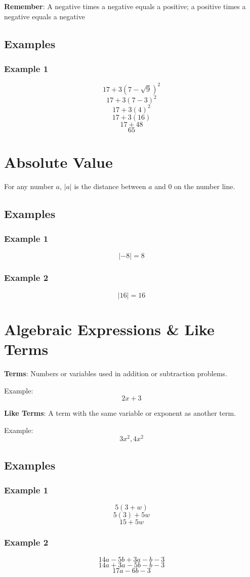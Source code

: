 \documentclass[letterpaper, 10pt]{article}
\begin{document}
\textbf{Remember}: A negative times a negative equals a positive; a positive times a negative equals a negative
	\subsection{Examples}
		\subsubsection{Example 1}
		$$17 + 3(7-\sqrt{9})^2 $$
		$$17 + 3(7 - 3)^2 $$
		$$17 + 3 (4)^2$$
		$$17 + 3(16)$$
		$$17 + 48$$	
		$$65$$
\section{Absolute Value}
	 For any number $a$, $|a|$ is the distance between $a$ and 0 on the number line.
	\subsection{Examples}
	\subsubsection{Example 1}
	$$
	|-8| = 8
	$$
	\subsubsection{Example 2}	
	$$
	|16| = 16
	$$
\section{Algebraic Expressions \& Like Terms}
\textbf{Terms}: Numbers or variables used in addition or subtraction problems.

Example: $$2x + 3$$

\noindent \textbf{Like Terms}: A term with the same variable or exponent as another term.

Example: $$3x^2, 4x^2$$


\subsection{Examples}
\subsubsection{Example 1}
$$5(3 + w)$$
$$5(3) + 5w$$
$$15 + 5w$$

\subsubsection{Example 2}
$$14a - 5b + 3a - b - 3$$
$$14a + 3a - 5b - b - 3$$
$$17a - 6b - 3$$
\end{document}
